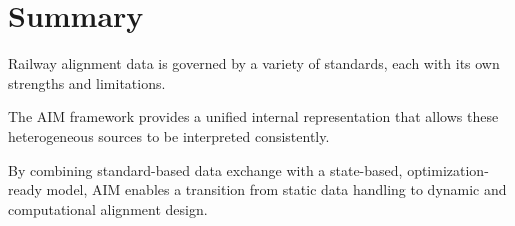 \section{Summary}

\begin{summary}
Railway alignment data is governed by a variety of standards, each with
its own strengths and limitations.

The AIM framework provides a unified internal representation that allows
these heterogeneous sources to be interpreted consistently.

By combining standard-based data exchange with a state-based,
optimization-ready model, AIM enables a transition from static data
handling to dynamic and computational alignment design.
\end{summary}
